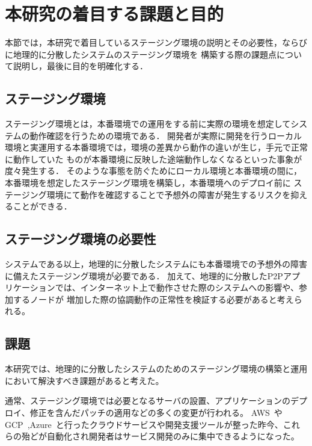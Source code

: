 \section{本研究の着目する課題と目的}
\label{introduction:issue-and-aim}

本節では，本研究で着目しているステージング環境の説明とその必要性，ならびに地理的に分散したシステムのステージング環境を
構築する際の課題点について説明し，最後に目的を明確化する．

\subsection{ステージング環境}

ステージング環境とは，本番環境での運用をする前に実際の環境を想定してシステムの動作確認を行うための環境である．
開発者が実際に開発を行うローカル環境と実運用する本番環境では，環境の差異から動作の違いが生じ，手元で正常に動作していた
ものが本番環境に反映した途端動作しなくなるといった事象が度々発生する．
そのような事態を防ぐためにローカル環境と本番環境の間に，本番環境を想定したステージング環境を構築し，本番環境へのデプロイ前に
ステージング環境にて動作を確認することで予想外の障害が発生するリスクを抑えることができる．

\subsection{ステージング環境の必要性}

システムである以上，地理的に分散したシステムにも本番環境での予想外の障害に備えたステージング環境が必要である．
加えて、地理的に分散したP2Pアプリケーションでは、インターネット上で動作させた際のシステムへの影響や、参加するノードが
増加した際の協調動作の正常性を検証する必要があると考えられる。

\subsection{課題}
\label{introduction:issue-and-aim:issue}

本研究では、地理的に分散したシステムのためのステージング環境の構築と運用において解決すべき課題があると考えた。

通常、ステージング環境では必要となるサーバの設置、アプリケーションのデプロイ、修正を含んだパッチの適用などの多くの変更が行われる。
AWS~\cite{AWS}やGCP~\cite{GCP},Azure~\cite{Azure}と行ったクラウドサービスや開発支援ツールが整った昨今、これらの殆どが自動化され開発者はサービス開発のみに集中できるようになった。


